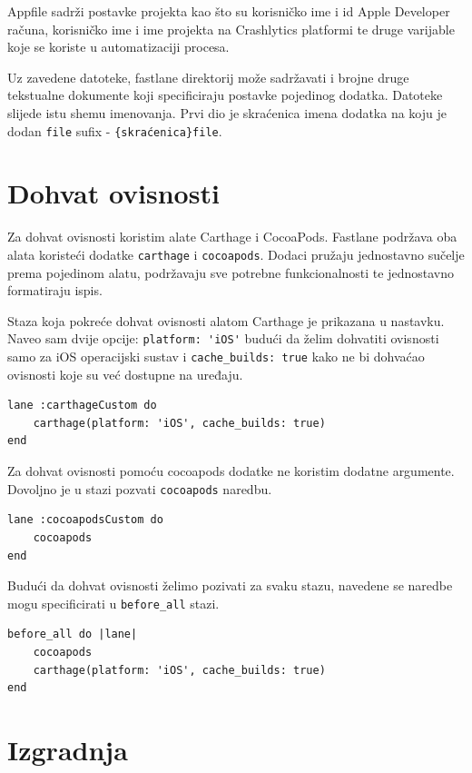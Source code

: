 \documentclass[times, utf8, diplomski, numeric]{fer}
\begin{document}
\begin{appendices}
Appfile sadrži postavke projekta kao što su korisničko ime i id Apple Developer računa, korisničko ime i ime projekta na Crashlytics platformi te druge varijable koje se koriste u automatizaciji procesa.

Uz zavedene datoteke, fastlane direktorij može sadržavati i brojne druge tekstualne dokumente koji specificiraju postavke pojedinog dodatka. Datoteke slijede istu shemu imenovanja. Prvi dio je skraćenica imena dodatka na koju je dodan \verb|file| sufix - \verb|{skraćenica}file|.

\section{Dohvat ovisnosti}

Za dohvat ovisnosti koristim alate Carthage i CocoaPods. Fastlane podržava oba alata koristeći dodatke \verb|carthage| i \verb|cocoapods|. Dodaci pružaju jednostavno sučelje prema pojedinom alatu, podržavaju sve potrebne funkcionalnosti te jednostavno formatiraju ispis.

Staza koja pokreće dohvat ovisnosti alatom Carthage je prikazana u nastavku. Naveo sam dvije opcije: \verb|platform: 'iOS'| budući da želim dohvatiti ovisnosti samo za iOS operacijski sustav i \verb|cache_builds: true| kako ne bi dohvaćao ovisnosti koje su već dostupne na uređaju.

\begin{verbatim}
lane :carthageCustom do
    carthage(platform: 'iOS', cache_builds: true)
end
\end{verbatim}

Za dohvat ovisnosti pomoću cocoapods dodatke ne koristim dodatne argumente. Dovoljno je u stazi pozvati \verb|cocoapods| naredbu.

\begin{verbatim}
lane :cocoapodsCustom do
    cocoapods
end
\end{verbatim}

Budući da dohvat ovisnosti želimo pozivati za svaku stazu, navedene se naredbe mogu specificirati u \verb|before_all| stazi.

\begin{verbatim}
before_all do |lane|
    cocoapods
    carthage(platform: 'iOS', cache_builds: true)
end
\end{verbatim}

\section{Izgradnja}


\end{appendices}
\end{document}

